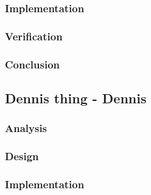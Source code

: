 \subsubsection{Implementation}
%
%
\subsubsection{Verification}
%
\subsubsection{Conclusion}
\subsection{Dennis thing - Dennis}
%
\subsubsection{Analysis}
%
%
\subsubsection{Design}
%
%
\subsubsection{Implementation}
%
%
